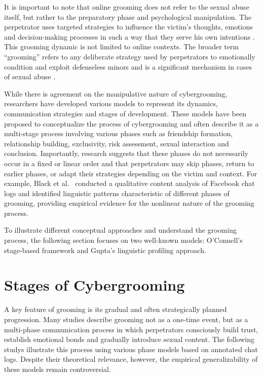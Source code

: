 It is important to note that online grooming does not refer to the sexual abuse itself, but rather to the preparatory phase and psychological manipulation. The perpetrator uses targeted strategies to influence the victim's thoughts, emotions and decision-making processes in such a way that they serve his own intentions \parencite{schittenhelm2024cybergrooming}. This grooming dynamic is not limited to online contexts. The broader term “grooming” refers to any deliberate strategy used by perpetrators to emotionally condition and exploit defenseless minors and is a significant mechanism in cases of sexual abuse \parencite{craven2006grooming}.

While there is agreement on the manipulative nature of cybergrooming, researchers have developed various models to represent its dynamics, communication strategies and stages of development\parencite{kloess2014online}. These models have been proposed to conceptualize the process of cybergrooming and often describe it as a multi-stage process involving various phases such as friendship formation, relationship building, exclusivity, risk assessment, sexual interaction and conclusion. Importantly, research suggests that these phases do not necessarily occur in a fixed or linear order and that perpetrators may skip phases, return to earlier phases, or adapt their strategies depending on the victim and context. For example, Black et al.\ \parencite{black2015linguistic} conducted a qualitative content analysis of Facebook chat logs and identified linguistic patterns characteristic of different phases of grooming, providing empirical evidence for the nonlinear nature of the grooming process. 

To illustrate different conceptual approaches and understand the grooming process, the following section focuses on two well-known models: O'Connell's stage-based framework and Gupta's linguistic profiling approach. %




\section{Stages of Cybergrooming}

A key feature of grooming is its gradual and often strategically planned progression. Many studies describe grooming not as a one-time event, but as a multi-phase communication process in which perpetrators consciously build trust, establish emotional bonds and gradually introduce sexual content. The following studys illustrate this process using various phase models based on annotated chat logs. Despite their theoretical relevance, however, the empirical generalizability of these models remain controversial.

